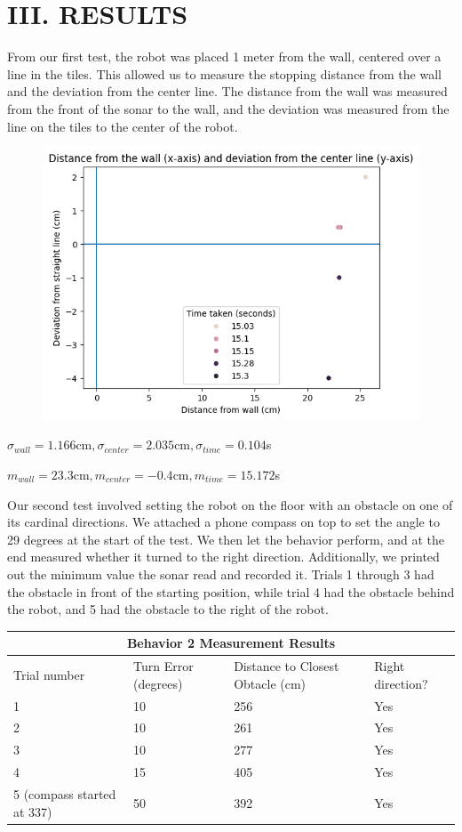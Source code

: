 \documentclass[11pt]{article}
\begin{document}
\section*{III. RESULTS}



From our first test, the robot was placed 1 meter from the wall, centered over a line in the tiles. This allowed us to measure the stopping distance from the wall and the deviation from the center line. The distance from the wall was measured from the front of the sonar to the wall, and the deviation was measured from the line on the tiles to the center of the robot.
\begin{figure}[h!]
\includegraphics[width=120mm]{behavior1.png}
\centering
\end{figure}

$\sigma_{wall} = 1.166 $cm$, \sigma_{center} = 2.035 $cm$, \sigma_{time} = 0.104 $s


$m_{wall} = 23.3 $cm$, m_{center} = -0.4 $cm$, m_{time} = 15.172 $s



Our second test involved setting the robot on the floor with an obstacle on one of its cardinal directions. We attached a phone compass on top to set the angle to 29 degrees at the start of the test. We then let the behavior perform, and at the end measured whether it turned to the right direction. Additionally, we printed out the minimum value the sonar read and recorded it. Trials 1 through 3 had the obstacle in front of the starting position, while trial 4 had the obstacle behind the robot, and 5 had the obstacle to the right of the robot.\\


\begin{tabular}{ |p{3cm}||p{4cm}|p{5cm}|p{3cm}|  }
 \hline
 \multicolumn{4}{|c|}{Behavior 2 Measurement Results} \\
 \hline
 Trial number & Turn Error (degrees) & Distance to Closest Obtacle (cm) & Right direction?\\
 \hline
 1 & 10 &256&   Yes\\
 2 &  10  & 261   &Yes\\
 3 &10 & 277&  Yes\\
 4 &15 & 405&  Yes\\
 5 (compass started at 337) & 50 & 392&Yes\\
 \hline
\end{tabular}\\
\end{document}
